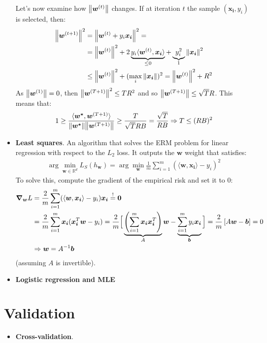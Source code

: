 \documentclass[../template.tex]{subfiles}
\begin{document}
\begin{itemize}
Let's now examine how $\norm{\bm{w}^{(t)}}$ changes. If at iteration $t$ the sample $(\bm{x_i}, y_i)$ is selected, then:
\begin{align*}
    \norm{\bm{w}^{(t+1)}}^2 &= \norm{\bm{w}^{(t)} + y_i \bm{x_i}}^2 = \\
    &= \norm{\bm{w}^{(t)}}^2 + 2\underbrace{ y_i \langle \bm{w}^{(t)}, \bm{x_i} \rangle}_{\leq 0} +\underbrace{ y_i^2 }_{1}\norm{\bm{x_i}}^2 \\
    &\leq \norm{\bm{w}^{(t)}}^2 + (\max_i \norm{\bm{x_i}})^2 = \norm{\bm{w}^{(t)}}^2 + R^2
\end{align*}
As $\norm{\bm{w}^{(1)}} = 0$, then $\norm{\bm{w}^{(T+1)}}^2 \leq TR^2$ and so $\norm{\bm{w}^{(T+1)}} \leq \sqrt{T} R$. This means that:
\begin{align*}
    1 \geq\frac{\langle \bm{w^*}, \bm{w}^{(T+1)} \rangle}{\norm{\bm{w^*}} \norm{\bm{w}^{(T+1)}}}  \geq \frac{T}{\sqrt{T} R B} = \frac{\sqrt{T}}{R B} \Rightarrow T \leq (RB)^2 
\end{align*}

\item \textbf{Least squares}. An algorithm that solves the ERM problem for linear regression with respect to the $L_2$ loss. It outputs the $\bm{w}$ weight that satisfies:
\begin{align*}
    \arg\min_{\bm{w} \in \mathbb{R}^d} L_S(h_{\bm{w}}) = \arg\min_{\bm{w}} \frac{1}{m} \sum_{i=1}^m (\langle \bm{w}, \bm{x_i} \rangle - y_i)^2 
\end{align*} 
To solve this, compute the gradient of the empirical risk and set it to $0$:
\begin{align*}
    \grad_{\bm{w}} L &= \frac{2}{m} \sum_{i=1}^m (\langle \bm{w}, \bm{x_i}\rangle - y_i )  \bm{x_i} \overset{!}{=} \bm{0} \\
    &= \frac{2}{m} \sum_{i=1}^m \bm{x_i}(\bm{x_i}^T \bm{w} - y_i) = \frac{2}{m}\Big [ \underbrace{\left(\sum_{i=1}^m \bm{x_i} \bm{x_i}^T\right) }_{A}\bm{w} - \underbrace{\sum_{i=1}^m y_i \bm{x_i}}_{\bm{b}} \Big] = \frac{2}{m}\left[A \bm{w}-\bm{b}\right] = 0\\
    &\Rightarrow \bm{w} = A^{-1} \bm{b}
\end{align*}
(assuming $A$ is invertible).

\item \textbf{Logistic regression and MLE} %
\end{itemize}

\section{Validation}
\begin{itemize}
    \item \textbf{Cross-validation}. 
\end{itemize}
\end{document}

